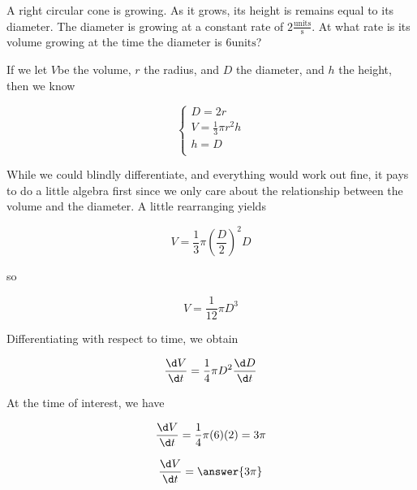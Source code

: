 \documentclass{ximera}
\author{Steven Gubkin}
\begin{document}
\begin{exercise}



A right circular cone is growing.  As it grows, its height is remains equal to its diameter. The diameter is growing at a constant rate of $2 \frac{\textrm{units}}{\textrm{s}}$. At what rate is its volume growing at the time the diameter is $6 \textrm{units}$?


\begin{hint}
	If we let $V$be the volume, $r$ the radius, and $D$ the diameter,  and $h$ the height, then we know

\[
\begin{cases}
	D = 2r\\
	V = \frac{1}{3} \pi r^2 h\\
	h = D\\
\end{cases}
\]
\end{hint}

\begin{hint}
	While we could blindly differentiate, and everything would work out fine, it pays to do a little algebra first since we only care about the relationship between the volume and the diameter.  A little rearranging yields

\[
V = \frac{1}{3} \pi \left(\frac{D}{2}\right)^2D
\]

so

\[
V = \frac{1}{12} \pi D^3
\]
\end{hint}

\begin{hint}
	Differentiating with respect to time, we obtain

\[\frac{\d V}{\d t} = \frac{1}{4} \pi D^2 \frac{\d D}{\d t}\]
\end{hint}

\begin{hint}
	At the time of interest, we have

\[\frac{\d V}{\d t} = \frac{1}{4} \pi (6) (2) = 3\pi\]
\end{hint}

\begin{prompt}
	\[\frac{\d V}{\d t} = \answer{ 3\pi}\]
\end{prompt}

\end{exercise}
\end{document}
